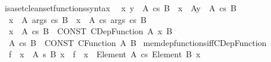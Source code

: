 \begin{isabellebody}
\isamarkupfalse%
\isanewline
{}\isamarkupfalse%
\ isa{\isacharunderscore}{\kern0pt}set{\isacharunderscore}{\kern0pt}clean{\isacharunderscore}{\kern0pt}set{\isacharunderscore}{\kern0pt}functions{\isacharunderscore}{\kern0pt}syntax\isanewline
\isanewline
{}\isamarkupfalse%
\isanewline
\ \ {\isachardoublequoteopen}{\isacharparenleft}{\kern0pt}x\ y\ {\isacharcolon}{\kern0pt}\ A{\isacharparenright}{\kern0pt}\ {\isasymrightarrow}cs\ B{\isachardoublequoteclose}\ {\isasymrightharpoonup}\ {\isachardoublequoteopen}{\isacharparenleft}{\kern0pt}x\ {\isacharcolon}{\kern0pt}\ A{\isacharparenright}{\kern0pt}{\isacharparenleft}{\kern0pt}y\ {\isacharcolon}{\kern0pt}\ A{\isacharparenright}{\kern0pt}\ {\isasymrightarrow}cs\ B{\isachardoublequoteclose}\isanewline
\ \ {\isachardoublequoteopen}{\isacharparenleft}{\kern0pt}x\ {\isacharcolon}{\kern0pt}\ A{\isacharparenright}{\kern0pt}\ args\ {\isasymrightarrow}cs\ B{\isachardoublequoteclose}\ {\isasymrightharpoonup}\ {\isachardoublequoteopen}{\isacharparenleft}{\kern0pt}x\ {\isacharcolon}{\kern0pt}\ A{\isacharparenright}{\kern0pt}\ {\isasymrightarrow}cs\ args\ {\isasymrightarrow}cs\ B{\isachardoublequoteclose}\isanewline
\ \ {\isachardoublequoteopen}{\isacharparenleft}{\kern0pt}x\ {\isacharcolon}{\kern0pt}\ A{\isacharparenright}{\kern0pt}\ {\isasymrightarrow}cs\ B{\isachardoublequoteclose}\ {\isasymrightleftharpoons}\ {\isachardoublequoteopen}CONST\ CDep{\isacharunderscore}{\kern0pt}Function\ A\ {\isacharparenleft}{\kern0pt}{\isasymlambda}x{\isachardot}{\kern0pt}\ B{\isacharparenright}{\kern0pt}{\isachardoublequoteclose}\isanewline
\ \ {\isachardoublequoteopen}A\ {\isasymrightarrow}cs\ B{\isachardoublequoteclose}\ {\isasymrightleftharpoons}\ {\isachardoublequoteopen}CONST\ CFunction\ A\ B{\isachardoublequoteclose}\isanewline
\isanewline
{}\isamarkupfalse%
\ mem{\isacharunderscore}{\kern0pt}dep{\isacharunderscore}{\kern0pt}functions{\isacharunderscore}{\kern0pt}iff{\isacharunderscore}{\kern0pt}CDep{\isacharunderscore}{\kern0pt}Function{\isacharcolon}{\kern0pt}\isanewline
\ \ {\isachardoublequoteopen}{\isacharparenleft}{\kern0pt}f\ {\isasymin}\ {\isacharparenleft}{\kern0pt}x\ {\isasymin}\ A{\isacharparenright}{\kern0pt}\ {\isasymrightarrow}s\ {\isacharparenleft}{\kern0pt}B\ x{\isacharparenright}{\kern0pt}{\isacharparenright}{\kern0pt}\ {\isasymlongleftrightarrow}\ {\isacharparenleft}{\kern0pt}f\ {\isacharcolon}{\kern0pt}\ {\isacharparenleft}{\kern0pt}x\ {\isacharcolon}{\kern0pt}\ Element\ A{\isacharparenright}{\kern0pt}\ {\isasymrightarrow}cs\ Element\ {\isacharparenleft}{\kern0pt}B\ x{\isacharparenright}{\kern0pt}{\isacharparenright}{\kern0pt}{\isachardoublequoteclose}\isanewline

\end{isabellebody}

